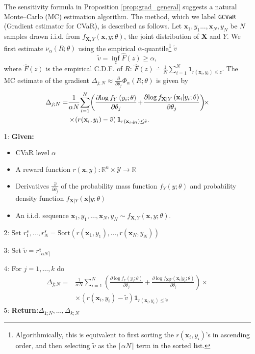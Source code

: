 \documentclass[letterpaper]{article}
\newcommand{\R}{\mathbb{R}}
\newcommand{\cvar}{\Phi_\alpha}
\newcommand{\var}{\nu_\alpha}
\newcommand{\cY}{\mathcal{Y}}
\newcommand{\bx}{\mathbf{x}}
\newcommand{\bX}{\mathbf{X}}
\newcommand{\Dth}{\frac{\partial}{\partial \theta_j}}
\newcommand{\Dt}[1]{\frac{\partial {#1}}{\partial \theta_j}}
\newcommand{\dcvar}{\Delta_{j;N}} %
\newcommand{\evar}{\tilde{v}}  %
\newcommand{\alggiven}{\textbf{Given:}}
\newcommand{\algreturn}{\textbf{Return:}}
\begin{document}
The sensitivity formula in Proposition \ref{prop:grad_general} suggests a natural Monte--Carlo (MC) estimation algorithm. The method, which we label \texttt{GCVaR} (Gradient estimator for CVaR), is described as follows. Let $\bx_{1},y_1\dots,\bx_{N},y_N$ be $N$ samples drawn i.i.d. from $f_{\bX,Y}(\bx,y;\theta)$, the joint distribution of $\bX$ and $Y$.
We first estimate $\var(R;\theta)$ using the empirical $\alpha$-quantile\footnote{Algorithmically, this is equivalent to first sorting the $r(\bx_i,y_i)$'s in ascending order, and then selecting $\evar$ as the $\lceil \alpha N \rceil$ term in the sorted list.} $\evar$
\begin{equation}\label{eq:empirical_VaR}
\evar = \inf_z \hat{F}(z) \geq \alpha,
\end{equation}
where $\hat{F}(z)$ is the empirical C.D.F. of $R$:
$
\hat{F}(z) \doteq \frac{1}{N} \sum_{i=1}^{N} \mathbf{1}_{r(\bx_{i},y_i)\leq z}.
$
The MC estimate of the gradient $\dcvar \approx \Dth\cvar (R;\theta)$ is given by
\begin{equation}\label{eq:simple_alg}
\begin{split}
\dcvar =& \frac{1}{\alpha N}\!\sum_{i=1}^{N} \!\left(\Dt{ \log f_{Y}\left(y_i;\theta\right)} \!+\! \Dt{ \log f_{\bX|Y}\left(\bx_{i}|y_i;\theta\right)}\right) \!\!\times\\
& \times\! \left( r(\bx_{i},y_i)-\evar \right) \mathbf{1}_{r(\bx_{i},y_i)\leq \evar}.
\end{split}\raisetag{0.8\baselineskip}
\end{equation}

\begin{algorithm} \label{alg:GCVaR}
\caption{\texttt{GCVaR}}
1: \alggiven
\begin{itemize}
\item CVaR level $\alpha$
\item A reward function $r(\bx,y):\R^n\times \cY \to \R$
\item Derivatives $\Dt{}$ of the probability mass function $f_Y\left(y;\theta\right)$ and probability density function $f_{\bX|Y}\left(\bx|y;\theta\right)$
\item An i.i.d. sequence $\bx_{1},y_1,\dots,\bx_{N},y_N \sim f_{\bX,Y}(\bx,y;\theta)$.
\end{itemize}
2: Set $r_1^s,\dots,r_N^s = \textrm{Sort}\left(r(\bx_{1},y_1),\dots,r(\bx_{N},y_N)\right)$

3: Set $\evar = r_{\lceil \alpha N \rceil}^s$

4: For $j = 1,\dots,k$ do
\begin{equation*}
\begin{split}
\dcvar =& \frac{1}{\alpha N}\! \sum_{i=1}^{N} \! \left(\Dt{ \log f_{Y}\left(y_i;\theta\right)} \!+\! \Dt{ \log f_{\bX|Y}\left(\bx_{i}|y_i;\theta\right)}\right)\!\! \times\\
& \times \! \left( r(\bx_{i},y_i)-\evar \right) \mathbf{1}_{r(\bx_{i},y_i)\leq \evar}
\end{split}
\end{equation*}
5: \algreturn $\Delta_{1;N},\dots,\Delta_{k;N}$
\end{algorithm}
\end{document}
